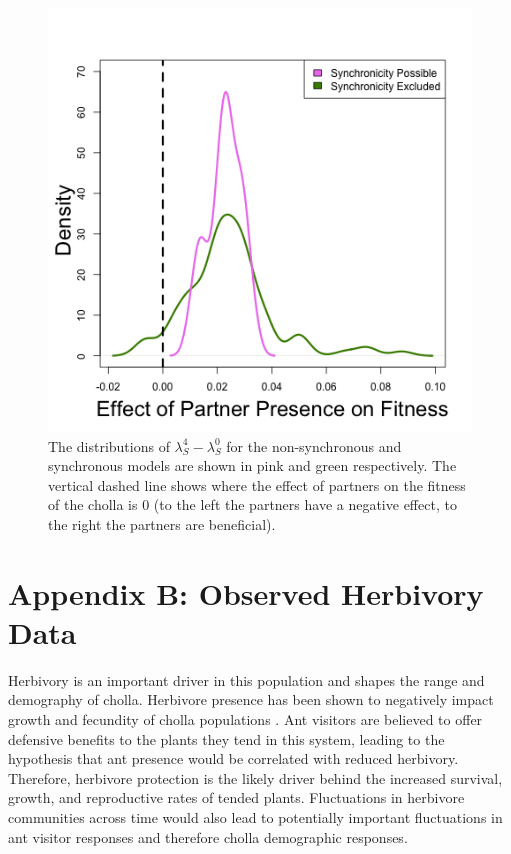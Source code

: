 \documentclass[11pt]{article}
\begin{document}
\begin{figure}[H]
	\includegraphics[width=\linewidth]{Figures/portfolio_effect.png}
	\caption{The distributions of $\lambda_{S}^4-\lambda_{S}^0$ for the non-synchronous and synchronous models are shown in pink and green respectively. The vertical dashed line shows where the effect of partners on the fitness of the cholla is 0 (to the left the partners have a negative effect, to the right the partners are beneficial).}
	\label{fig:Portfolio}
\end{figure}

\section*{Appendix B: Observed Herbivory Data} \label{appendix:B}
Herbivory is an important driver in this population and shapes the range and demography of cholla.
Herbivore presence has been shown to negatively impact growth and fecundity of cholla populations \citep{Miller2009}.
Ant visitors are believed to offer defensive benefits to the plants they tend in this system, leading to the hypothesis that ant presence would be correlated with reduced herbivory.
Therefore, herbivore protection is the likely driver behind the increased survival, growth, and reproductive rates of tended plants. 
Fluctuations in herbivore communities across time would also lead to potentially important fluctuations in ant visitor responses and therefore cholla demographic responses.
\end{document}

